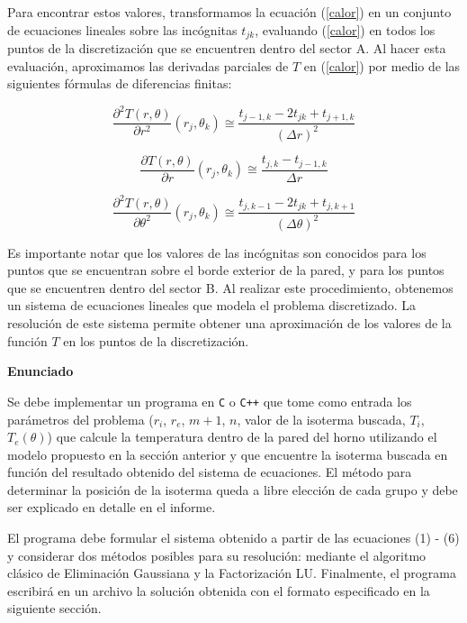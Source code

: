 \medskip

Para encontrar estos valores, transformamos la ecuaci\'on (\ref{calor}) en un conjunto de ecuaciones lineales sobre las inc\'ognitas $t_{jk}$, evaluando (\ref{calor}) en todos los puntos de la discretizaci\'on que se encuentren dentro del sector A. Al hacer esta evaluaci\'on, aproximamos las derivadas parciales de $T$ en (\ref{calor}) por medio de las siguientes f\'ormulas de diferencias finitas:


\begin{equation}
\frac{\partial^2T(r,\theta)}{\partial r^2}(r_j,\theta_k) \cong \frac{t_{j-1,k}-2t_{jk}+t_{j+1,k}}{(\Delta r)^2}
\end{equation}

\begin{equation}
\frac{\partial T(r,\theta)}{\partial r}(r_j,\theta_k) \cong \frac{t_{j,k}-t_{j-1,k}}{\Delta r}
\end{equation}

\begin{equation}
\frac{\partial^2T(r,\theta)}{\partial \theta^2}(r_j,\theta_k) \cong \frac{t_{j,k-1}-2t_{jk}+t_{j,k+1}}{(\Delta \theta)^2}
\end{equation}



Es importante notar que los valores de las inc\'ognitas son conocidos para los puntos que se encuentran sobre el borde exterior de la pared, y para los puntos que se encuentren dentro del sector B. Al realizar este procedimiento, obtenemos un sistema de ecuaciones lineales que modela el problema discretizado. La resoluci\'on de este sistema permite obtener una aproximaci\'on de los valores de la funci\'on $T$ en los puntos de la discretizaci\'on.

{\bf Enunciado}

Se debe implementar un programa en \verb+C+ o \verb-C++- que tome como entrada los par\'ametros del problema ($r_i$, $r_e$, $m+1$,
$n$, valor de la isoterma buscada, $T_i$, $T_e(\theta)$) que calcule la temperatura dentro de la pared del horno utilizando el
modelo propuesto en la secci\'on anterior y que encuentre la isoterma buscada en funci\'on del resultado obtenido del
sistema de ecuaciones. El m\'etodo para determinar la posici\'on de la isoterma queda a libre elecci\'on de cada grupo y
debe ser explicado en detalle en el informe.

El programa debe formular el sistema obtenido a partir de las ecuaciones (1) - (6) y considerar dos m\'etodos posibles
para su resoluci\'on: mediante el algoritmo cl\'asico de Eliminaci\'on Gaussiana y la Factorizaci\'on LU. Finalmente, el
programa escribir\'a en un archivo la soluci\'on obtenida con el formato especificado en la siguiente secci\'on.

